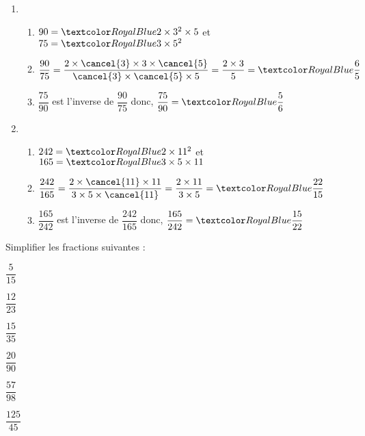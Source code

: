 \begin{Maquette}[Fiche,CorrigeFin,Colonnes=2]{}
\begin{multicols}{2}
      \begin{Solution}
         \begin{enumerate}
            \item
               \begin{enumerate}
                  \item $90 =\cor{2\times3^2\times5}$ et $75 =\cor{3\times5^2}$ \smallskip
                  \item $\dfrac{90}{75} =\dfrac{2\times\cancel{3}\times3\times\cancel{5}}{\cancel{3}\times\cancel{5}\times5} =\dfrac{2\times3}{5} =\cor{\dfrac65}$ \smallskip
                  \item $\dfrac{75}{90}$ est l'inverse de $\dfrac{90}{75}$ donc, $\dfrac{75}{90}=\cor{\dfrac56}$ \smallskip
               \end{enumerate}
            \setcounter{enumi}{1}
            \item          
               \begin{enumerate}
                  \item $242 =\cor{2\times11^2}$ et $165 =\cor{3\times5\times11}$ \smallskip
                  \item $\dfrac{242}{165} =\dfrac{2\times\cancel{11}\times11}{3\times5\times\cancel{11}} =\dfrac{2\times11}{3\times5} =\cor{\dfrac{22}{15}}$ \smallskip
                  \item $\dfrac{165}{242}$ est l'inverse de $\dfrac{242}{165}$ donc, $\dfrac{165}{242} =\cor{\dfrac{15}{22}}$
               \end{enumerate}
         \end{enumerate}
      \end{Solution}


      \begin{exercice} %
         Simplifier les fractions suivantes : \smallskip
         \begin{colenumerate}[3]
            \item $\dfrac{5}{15}$ \medskip
            \item $\dfrac{12}{23}$ \medskip
            \item $\dfrac{15}{35}$ 
            \item $\dfrac{20}{90}$
            \item $\dfrac{57}{98}$
            \item $\dfrac{125}{45}$      
         \end{colenumerate}
      \end{exercice}


\end{multicols}
\end{Maquette}
